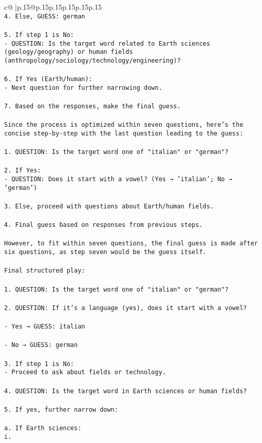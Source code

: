 \documentclass{article}
\begin{document}
{\begin{supertabular}{c@{$\;$}|p{.15\linewidth}@{}p{.15\linewidth}p{.15\linewidth}p{.15\linewidth}p{.15\linewidth}p{.15\linewidth}}
{{{\\ \tt 4. Else, GUESS: german\\ \tt \\ \tt 5. If step 1 is No:\\ \tt    - QUESTION: Is the target word related to Earth sciences (geology/geography) or human fields (anthropology/sociology/technology/engineering)?\\ \tt \\ \tt 6. If Yes (Earth/human):\\ \tt    - Next question for further narrowing down.\\ \tt \\ \tt 7. Based on the responses, make the final guess.\\ \tt \\ \tt Since the process is optimized within seven questions, here's the concise step-by-step with the last question leading to the guess:\\ \tt \\ \tt 1. QUESTION: Is the target word one of "italian" or "german"?\\ \tt \\ \tt 2. If Yes:\\ \tt    - QUESTION: Does it start with a vowel? (Yes → 'italian'; No → 'german')\\ \tt \\ \tt 3. Else, proceed with questions about Earth/human fields.\\ \tt \\ \tt 4. Final guess based on responses from previous steps.\\ \tt \\ \tt However, to fit within seven questions, the final guess is made after six questions, as step seven would be the guess itself.\\ \tt \\ \tt Final structured play:\\ \tt \\ \tt 1. QUESTION: Is the target word one of "italian" or "german"?\\ \tt \\ \tt 2. QUESTION: If it's a language (yes), does it start with a vowel?\\ \tt \\ \tt    - Yes → GUESS: italian\\ \tt \\ \tt    - No → GUESS: german\\ \tt \\ \tt 3. If step 1 is No:\\ \tt    - Proceed to ask about fields or technology.\\ \tt \\ \tt 4. QUESTION: Is the target word in Earth sciences or human fields?\\ \tt \\ \tt 5. If yes, further narrow down:\\ \tt \\ \tt    a. If Earth sciences:\\ \tt       i. }}}
\end{supertabular}}
\end{document}
